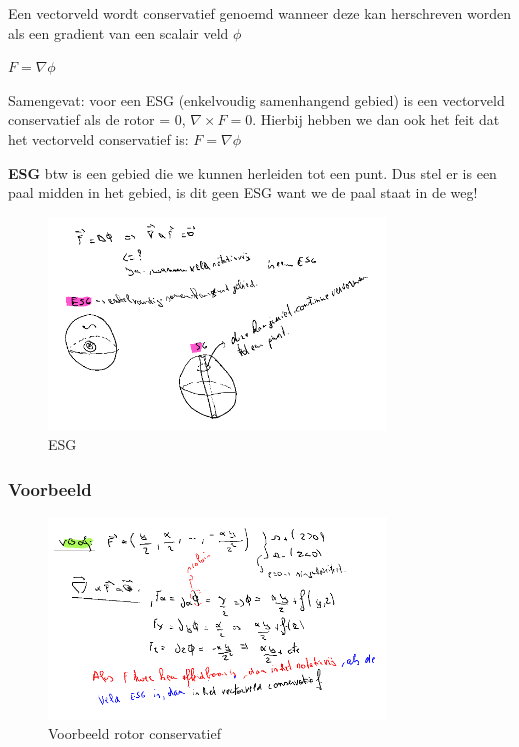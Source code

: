 \documentclass[a4paper]{report}
\begin{document}
Een vectorveld wordt conservatief genoemd wanneer deze kan herschreven worden als een gradient van een scalair veld $\phi$

$F = \nabla \phi$

Samengevat: voor een ESG (enkelvoudig samenhangend gebied) is een vectorveld conservatief als de rotor = 0, $\nabla \times F = 0$. Hierbij hebben we dan ook het feit dat het vectorveld conservatief is: $F = \nabla \phi$

\textbf{ESG} btw is een gebied die we kunnen herleiden tot een punt. Dus stel er is een paal midden in het gebied, is dit geen ESG want we de paal staat in de weg!


\begin{figure}[H]
	\centering
	\includegraphics[width=0.8\textwidth]{assets/ESG.png}
	\caption{ESG}
	\label{fig:esg}
\end{figure}

\subsubsection{Voorbeeld}

\begin{figure}[H]
	\centering
	\includegraphics[width=0.8\textwidth]{assets/voorbeeld_rotor_conservatief.png}
	\caption{Voorbeeld rotor conservatief}
	\label{fig:voorbeeld_rotor_conservatief}
\end{figure}
\end{document}
